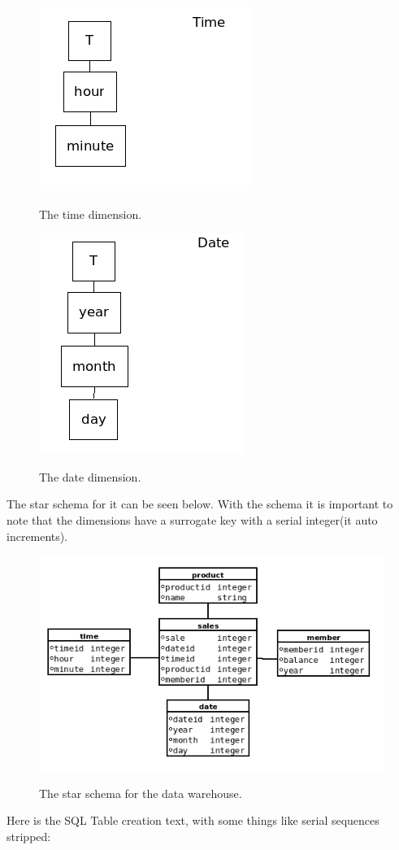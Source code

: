 	\begin{minipage}{0.45\textwidth}
	\begin{figure}[H]
	\centering
	\includegraphics[scale=0.5]{dimensionTime}
	\label{image:time}
	\caption{The time dimension.}
	\end{figure}
	\end{minipage}
	\begin{minipage}{0.45\textwidth}
	\begin{figure}[H]
	\centering
	\includegraphics[scale=0.5]{dimensionDate}
	\label{image:date}
	\caption{The date dimension.}
	\end{figure}
	\end{minipage}
	
	The star schema for it can be seen below.  With the schema it is important to note that the dimensions have a surrogate key with a serial integer(it auto increments).
	
	
	\begin{figure}[H]
	\centering
	\includegraphics[scale=0.75]{star-scheme}
	\label{image:starschema}
	\caption{The star schema for the data warehouse.}
	\end{figure}
	
	Here is the SQL Table creation text, with some things like serial sequences stripped:
	
	
		
	



